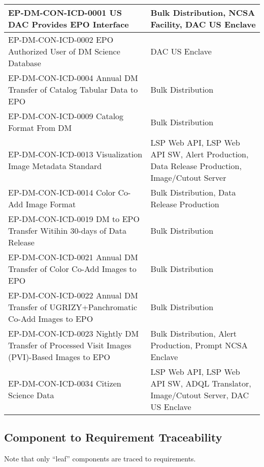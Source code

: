 \begin{xtabular}{p{0.4\textwidth}p{0.55\textwidth}}
EP-DM-CON-ICD-0001 US DAC Provides EPO Interface & Bulk Distribution, NCSA Facility, DAC US Enclave \\ \hline
EP-DM-CON-ICD-0002 EPO Authorized User of DM Science Database & DAC US Enclave \\ \hline
EP-DM-CON-ICD-0004 Annual DM Transfer of Catalog Tabular Data to EPO & Bulk Distribution \\ \hline
EP-DM-CON-ICD-0009 Catalog Format From DM & Bulk Distribution \\ \hline
EP-DM-CON-ICD-0013 Visualization Image Metadata Standard & LSP Web API, LSP Web API SW, Alert Production, Data Release Production, Image/Cutout Server \\ \hline
EP-DM-CON-ICD-0014 Color Co-Add Image Format & Bulk Distribution, Data Release Production \\ \hline
EP-DM-CON-ICD-0019 DM to EPO Transfer Witihin 30-days of Data Release & Bulk Distribution \\ \hline
EP-DM-CON-ICD-0021 Annual DM Transfer of Color Co-Add Images to EPO & Bulk Distribution \\ \hline
EP-DM-CON-ICD-0022 Annual DM Transfer of UGRIZY+Panchromatic Co-Add Images to EPO & Bulk Distribution \\ \hline
EP-DM-CON-ICD-0023 Nightly DM Transfer of Processed Visit Images (PVI)-Based Images to EPO & Bulk Distribution, Alert Production, Prompt NCSA Enclave \\ \hline
EP-DM-CON-ICD-0034 Citizen Science Data & LSP Web API, LSP Web API SW, ADQL Translator, Image/Cutout Server, DAC US Enclave \\ \hline

\end{xtabular}
\normalsize

\subsection{Component to Requirement
Traceability}\label{component-to-requirement-traceability}

Note that only ``leaf'' components are traced to requirements.

\footnotesize

